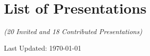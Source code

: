 \documentclass[10pt,a4paper,roman,]{moderncv} %
\begin{document}

% 


% 




\clearpage
\section{List of Presentations}
\begin{center}
    \textit{(20 Invited and 18 Contributed Presentations)\\}
\end{center}

 
{}




\begin{center}
    Last Updated: \today
\end{center}
\end{document}
